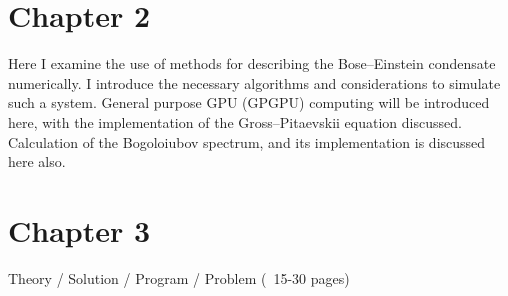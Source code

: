 \iffalse
Introduction (~5-10 pages)

    - Thesis Statement (one or two sentences)
        What is your thesis about and what have you done?
        If you have a hypothesis what is it?
        How will you test (prove/disprove) your hypothesis?
    - Motivation
        Why is this problem you've worked on important
    - Goals / Objectives
        What are you trying to do and why?
        How will you or the reader know if or when you've met your objectives?
    - **** Contributions *****
        What is new, different, better, significant?
        Why is the world a better place because of what you've done?
        What have you contributed to the field of research?
        What is now known/possible/better because of your thesis?
    Outline of the thesis (optional)
\fi

\section{Chapter 2}
    Here I examine the use of methods for describing the Bose--Einstein condensate numerically. I introduce the necessary algorithms and considerations to simulate such a system. General purpose GPU (GPGPU) computing will be introduced here, with the implementation of the Gross--Pitaevskii equation discussed. Calculation of the Bogoloiubov spectrum, and its implementation is discussed here also.

\iffalse
Background / Related Work (~8-20 pages)
    More than a literature review
    Organize related work - impose structure
    Be clear as to how previous work being described relates to your own.
    The reader should not be left wondering why you've described something!!
    Critique the existing work - Where is it strong where is it weak? What are the unreasonable/undesirable assumptions?
    Identify opportunities for more research (i.e., your thesis) Are there unaddressed, or more important related topics?
    After reading this chapter, one should understand the motivation for and importance of your thesis
    You should clearly and precisely define all of the key concepts dealt with in the rest of the thesis, and teach the reader what s/he needs to know to understand the rest of the thesis.
\fi

\section{Chapter 3}
\iffalse
Theory / Solution / Program / Problem (~15-30 pages)

